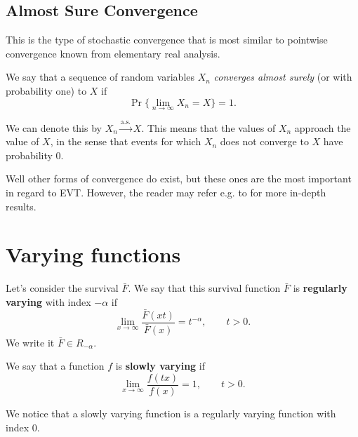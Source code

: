 \subsection*{Almost Sure Convergence} 

This is the type of stochastic convergence that is most similar to pointwise convergence known from elementary real analysis.

\begin{definition}
We say that a sequence of random variables $X_n$ \emph{converges almost surely} (or with probability one) to $X$ if 
\begin{equation}
 \Pr \Big\{ \lim_{n \to \infty} X_n = X \Big\} = 1.
\end{equation}
\end{definition}
We can denote this by $X_n\stackrel{\text{a.s.}}{\rightarrow} X$. This means that the values of $X_n$ approach the value of $X$, in the sense that events for which $X_n$ does not converge to $X$ have probability 0.


Well other forms of convergence do exist, but these ones are the most important in regard to EVT. However, the reader may refer e.g. to \citet{lafaye_de_micheaux_understanding_2009}  for more in-depth results.

\section{Varying functions}\label{app:varying}

\begin{definition}
Let's consider the survival $\bar{F}$. We say that this survival function $\bar{F}$ is \textbf{regularly varying} with index $-\alpha$ if
\begin{equation}
\displaystyle{\lim_{x \to \infty}} \frac{\bar{F}(xt)}{\bar{F}(x)}=t^{-\alpha}, \qquad t>0. 
\end{equation}
We write it $\bar{F}\in R_{-\alpha}$.
\end{definition}

\begin{definition}
We say that a function $f$ is \textbf{slowly varying} if
\begin{equation}
\displaystyle{\lim_{x \to \infty}} \frac{f(t x)}{f(x)}=1, \qquad t>0. 
\end{equation}
\end{definition}
We notice that a slowly varying function is a regularly varying function with index 0.



